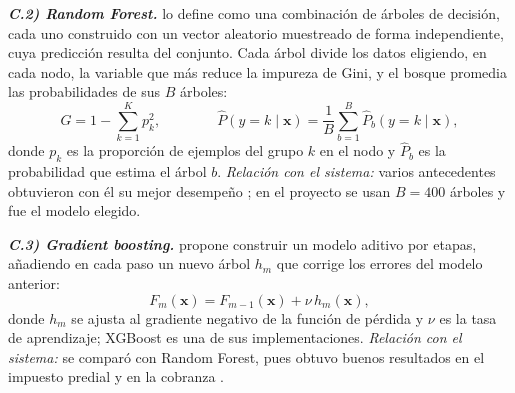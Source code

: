 \documentclass[12pt,a4paper]{report}
\begin{document}
\noindent\textbf{\textit{C.2) Random Forest.}} \textcite{breiman2001} lo define como una combinación de árboles de decisión, cada uno construido con un vector aleatorio muestreado de forma independiente, cuya predicción resulta del conjunto. Cada árbol divide los datos eligiendo, en cada nodo, la variable que más reduce la impureza de Gini, y el bosque promedia las probabilidades de sus $B$ árboles:
\begin{equation}
G=1-\sum_{k=1}^{K}p_{k}^{2},\qquad\qquad \hat{P}(y=k\mid\mathbf{x})=\frac{1}{B}\sum_{b=1}^{B}\hat{P}_{b}(y=k\mid\mathbf{x}),
\label{eq:rf}
\end{equation}
donde $p_k$ es la proporción de ejemplos del grupo $k$ en el nodo y $\hat{P}_{b}$ es la probabilidad que estima el árbol $b$. \textit{Relación con el sistema:} varios antecedentes obtuvieron con él su mejor desempeño \parencite{orozco2023,sifani2025,lismoncaleano2026,yang2025}; en el proyecto se usan $B=400$ árboles y fue el modelo elegido.

\noindent\textbf{\textit{C.3) Gradient boosting.}} \textcite{friedman2001} propone construir un modelo aditivo por etapas, añadiendo en cada paso un nuevo árbol $h_m$ que corrige los errores del modelo anterior:
\begin{equation}
F_{m}(\mathbf{x})=F_{m-1}(\mathbf{x})+\nu\,h_{m}(\mathbf{x}),
\label{eq:gb}
\end{equation}
donde $h_m$ se ajusta al gradiente negativo de la función de pérdida y $\nu$ es la tasa de aprendizaje; XGBoost es una de sus implementaciones. \textit{Relación con el sistema:} se comparó con Random Forest, pues obtuvo buenos resultados en el impuesto predial \parencite{sugiana2026} y en la cobranza \parencite{carrera2024}.
\end{document}
